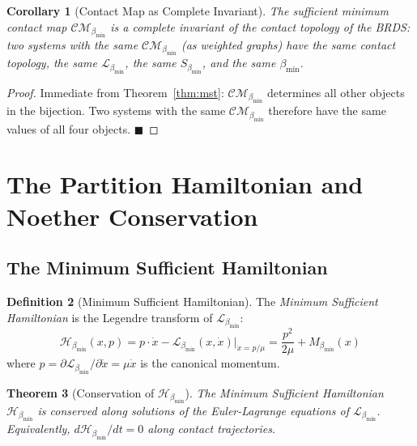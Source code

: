 \documentclass[12pt, a4paper]{article}
\theoremstyle{plain}
\newtheorem{theorem}{Theorem}[section]
\newtheorem{corollary}[theorem]{Corollary}
\theoremstyle{definition}
\newtheorem{definition}[theorem]{Definition}
\theoremstyle{remark}
\newcommand{\bmin}{\beta_{\min}}
\newcommand{\Lmin}{\mathcal{L}_{\bmin}}
\newcommand{\Smin}{S_{\bmin}}
\newcommand{\Hmin}{\mathcal{H}_{\bmin}}
\newcommand{\CM}{\mathcal{CM}}
\newcommand{\qed}{\hfill$\blacksquare$}
\begin{document}
\begin{corollary}[Contact Map as Complete Invariant]
\label{cor:complete}
The sufficient minimum contact map $\CM_{\bmin}$ is a complete invariant of the
contact topology of the BRDS: two systems with the same $\CM_{\bmin}$ (as
weighted graphs) have the same contact topology, the same $\Lmin$, the same
$\Smin$, and the same $\bmin$.
\end{corollary}

\begin{proof}
Immediate from Theorem~\ref{thm:mst}: $\CM_{\bmin}$ determines all other objects
in the bijection. Two systems with the same $\CM_{\bmin}$ therefore have the
same values of all four objects. \qed
\end{proof}

\section{The Partition Hamiltonian and Noether Conservation}
\label{sec:hamiltonian}

\subsection{The Minimum Sufficient Hamiltonian}

\begin{definition}[Minimum Sufficient Hamiltonian]
\label{def:hamiltonian}
The \emph{Minimum Sufficient Hamiltonian} is the Legendre transform of $\Lmin$:
\[
  \Hmin(x, p) = p\cdot\dot{x} - \Lmin(x, \dot{x})\big|_{\dot{x} = p/\mu}
              = \frac{p^2}{2\mu} + M_{\bmin}(x)
\]
where $p = \partial\Lmin/\partial\dot{x} = \mu\dot{x}$ is the canonical
momentum.
\end{definition}

\begin{theorem}[Conservation of $\Hmin$]
\label{thm:conservation}
The Minimum Sufficient Hamiltonian $\Hmin$ is conserved along solutions of the
Euler-Lagrange equations of $\Lmin$. Equivalently, $d\Hmin/dt = 0$ along
contact trajectories.
\end{theorem}
\end{document}
